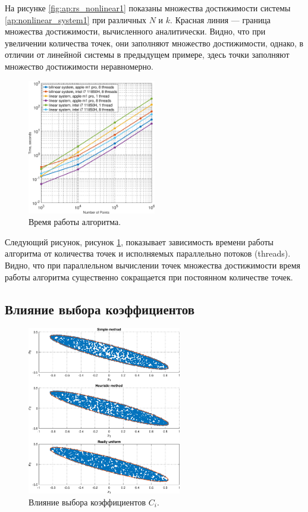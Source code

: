 \documentclass[../main.tex]{subfiles}
\begin{document}
   На рисунке \ref{fig:ap:rs_nonlinear1} показаны множества достижимости системы \eqref{ap:nonlinear_system1} при различных $N$ и $k$.
    Красная линия --- граница множества достижимости, вычисленного аналитически.
  Видно, что при увеличении количества точек, они заполняют множество достижимости, однако, в отличии от линейной системы в предыдущем примере, здесь точки заполняют множество достижимости неравномерно.
  
   \begin{figure}[ht]
  	\centering
  	\includegraphics[width=0.5\textwidth]{images/time_complexity.eps}
  	\caption{Время работы алгоритма.}
  	\label{fig:ap:timings}
  \end{figure}

 Следующий рисунок, рисунок \ref{fig:ap:timings}, показывает зависимость времени работы алгоритма от количества точек и исполняемых параллельно потоков (threads).
 Видно, что при параллельном вычислении точек множества достижимости время работы алгоритма существенно сокращается при постоянном количестве точек.

 \subsection{Влияние выбора коэффициентов }
 
   \begin{figure}[ht]
 	\centering
 	\includegraphics[width=0.6\textwidth]{images/three_linear_system_sets.eps}
 	\caption{Влияние выбора коэффициентов $C_i$.}
 	\label{fig:ap:coeffs_RS}
 \end{figure}
 
\end{document}
